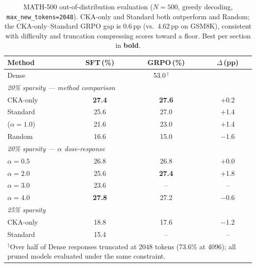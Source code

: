 \begin{table}[h]
\centering
\small
\caption{MATH-500 out-of-distribution evaluation ($N{=}500$, greedy decoding, \texttt{max\_new\_tokens=2048}). CKA-only and Standard both outperform \rasp{} and Random; the CKA-only--Standard GRPO gap is 0.6\,pp (vs.\ 4.62\,pp on GSM8K), consistent with difficulty and truncation compressing scores toward a floor. Best per section in \textbf{bold}.}
\label{tab:math500}
\begin{tabular}{@{}lccc@{}}
\toprule
Method & SFT\,(\%) & GRPO\,(\%) & $\Delta$\,(pp) \\
\midrule
Dense & \multicolumn{3}{c}{53.0\,$^\dagger$} \\
\midrule
\multicolumn{4}{l}{\textit{20\% sparsity --- method comparison}} \\
CKA-only & \textbf{27.4} & \textbf{27.6} & $+$0.2 \\
Standard & 25.6 & 27.0 & $+$1.4 \\
\rasp{} ($\alpha{=}1.0$) & 21.6 & 23.0 & $+$1.4 \\
Random & 16.6 & 15.0 & $-$1.6 \\
\midrule
\multicolumn{4}{l}{\textit{20\% sparsity --- $\alpha$ dose-response}} \\
$\alpha{=}0.5$ & 26.8 & 26.8 & $+$0.0 \\
$\alpha{=}2.0$ & 25.6 & \textbf{27.4} & $+$1.8 \\
$\alpha{=}3.0$ & 23.6 & -- & -- \\
$\alpha{=}4.0$ & \textbf{27.8} & 27.2 & $-$0.6 \\
\midrule
\multicolumn{4}{l}{\textit{25\% sparsity}} \\
CKA-only & 18.8 & 17.6 & $-$1.2 \\
Standard & 15.4 & -- & -- \\
\bottomrule
\multicolumn{4}{p{0.85\columnwidth}}{\footnotesize $^\dagger$Over half of Dense responses truncated at 2048 tokens (73.6\% at 4096); all pruned models evaluated under the same constraint.}
\end{tabular}
\end{table}

